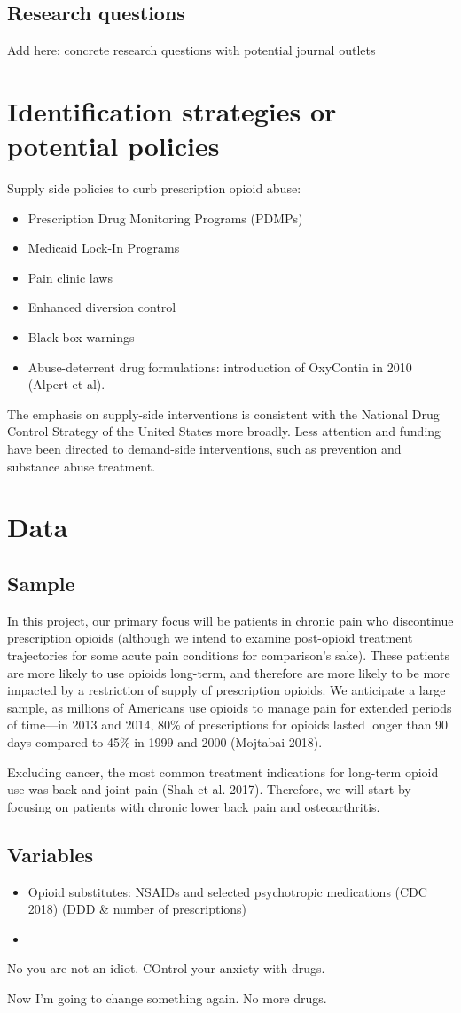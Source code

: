\documentclass[10pt]{article}
\begin{document}
\subsection{Research questions}
Add here: concrete research questions with potential journal outlets
\section{Identification strategies or potential policies}
Supply side policies to curb prescription opioid abuse:
\begin{itemize}
\item Prescription Drug Monitoring Programs (PDMPs)
\item Medicaid Lock-In Programs
\item Pain clinic laws
\item Enhanced diversion control
\item Black box warnings
\item Abuse-deterrent drug formulations: introduction of OxyContin in 2010 (Alpert et al). 
\end{itemize}
The emphasis on supply-side interventions is consistent with the National Drug Control Strategy of the United States more broadly. 
Less attention and funding have been directed to demand-side interventions, such as prevention and substance abuse treatment.




\section{Data}

\subsection{Sample}
In this project, our primary focus will be patients in chronic pain who discontinue prescription opioids (although we intend to examine post-opioid treatment trajectories for some acute pain conditions for comparison’s sake). These patients are more likely to use opioids long-term, and therefore are more likely to be more impacted by a restriction of supply of prescription opioids. We anticipate a large sample, as millions of Americans use opioids to manage pain for extended periods of time—in 2013 and 2014, 80\% of prescriptions for opioids lasted longer than 90 days compared to 45\% in 1999 and 2000 (Mojtabai 2018). 

Excluding cancer, the most common treatment indications for long-term opioid use was back and joint pain (Shah et al. 2017). Therefore, we will start by focusing on patients with chronic lower back pain and osteoarthritis.

\subsection{Variables}

\begin{itemize}
\item Opioid substitutes: NSAIDs and selected psychotropic medications (CDC 2018) (DDD \& number of prescriptions)
\item 
\end{itemize}



No you are not an idiot.  
COntrol your anxiety with drugs.  

Now I'm going to change something again.  No more drugs.
\end{document}
